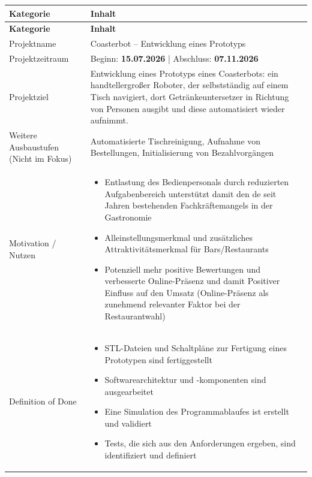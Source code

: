 \documentclass[
  a4paper,
  12pt,
  DIV=12,        %
  parskip=half,  %
  headings=small %
]{scrartcl}
\theoremstyle{definition}
\theoremstyle{definition}
\begin{document}
\begin{longtable}{@{}p{}p{}@{}}
\toprule
\textbf{Kategorie} & \textbf{Inhalt} \\
\midrule
\endfirsthead
\toprule
\textbf{Kategorie} & \textbf{Inhalt} \\
\midrule
\endhead

Projektname & Coasterbot -- Entwicklung eines Prototyps \\
\midrule

Projektzeitraum & Beginn: \textbf{15.07.2026} \quad | \quad Abschluss: \textbf{07.11.2026}\\
\midrule

Projektziel & Entwicklung eines Prototyps eines Coasterbots: ein handtellergro{\ss}er Roboter, der selbstst\"andig auf einem Tisch navigiert, dort Getr\"ankeuntersetzer in Richtung von Personen ausgibt und diese automatisiert wieder aufnimmt. \\
\midrule

Weitere Ausbaustufen (Nicht im Fokus) & Automatisierte Tischreinigung, Aufnahme von Bestellungen, Initialisierung von Bezahlvorg\"angen \\
\midrule



Motivation / Nutzen &
\vspace{-\baselineskip}
\begin{itemize}[partopsep=0pt, topsep=6pt, itemsep=2pt]
  \item Entlastung des Bedienpersonals durch reduzierten Aufgabenbereich unterstützt damit den de seit Jahren bestehenden Fachkräftemangels in der Gastronomie~\cite{DEHOGA2025Q4}
  \item Alleinstellungsmerkmal und zusätzliches Attraktivitätsmerkmal f\"ur Bars/Restaurants
  \item Potenziell mehr positive Bewertungen und verbesserte Online-Pr\"asenz und damit Positiver Einfluss auf den Umsatz (Online-Pr\"asenz als zunehmend relevanter Faktor bei der Restaurantwahl)~\cite{BibEntry2026Jul}
\end{itemize} \\
\midrule


Definition of Done &
\vspace{-\baselineskip}
\begin{itemize}[partopsep=0pt, topsep=6pt, itemsep=2pt]
  \item STL-Dateien und Schaltpl\"ane zur Fertigung eines Prototypen sind fertiggestellt
  \item Softwarearchitektur und -komponenten sind ausgearbeitet
  \item Eine Simulation des Programmablaufes ist erstellt und validiert
  \item Tests, die sich aus den Anforderungen ergeben, sind identifiziert und definiert
\end{itemize} \\
\midrule


\end{longtable}
\end{document}

